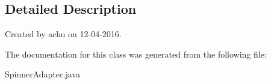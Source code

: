 \subsection{\-Detailed \-Description}
\-Created by achu on 12-\/04-\/2016. 

\-The documentation for this class was generated from the following file\-:\begin{DoxyCompactItemize}
\item 
\-Spinner\-Adapter.\-java\end{DoxyCompactItemize}
